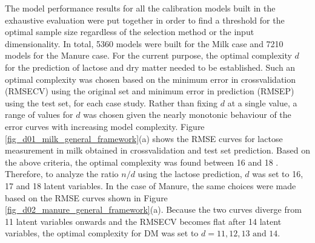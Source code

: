 \documentclass[journal=ancham,manuscript=article]{achemso}
\begin{document}
The model performance results for all the calibration models built in the exhaustive evaluation were put together in order to find a threshold for the optimal sample size regardless of the selection method or the input dimensionality. In total, 5360 models were built for the Milk case and 7210 models for the Manure case. For the current purpose, the optimal complexity $d$ for the prediction of lactose and dry matter needed to be established. Such an optimal complexity was chosen based on the minimum error in crossvalidation (RMSECV) using the original set and minimum error in prediction (RMSEP) using the test set, for each case study. Rather than fixing $d$ at a single value, a range of values for $d$ was chosen given the nearly monotonic behaviour of the error curves with increasing model complexity. 
Figure \ref{fig_d01_milk_general_framework}(a) shows the RMSE curves for lactose measurement in milk obtained in crossvalidation and test set prediction. Based on the above criteria, the optimal complexity was found between 16 and 18 \cite{Diaz-Olivares2020}. Therefore, to analyze the ratio $n/d$ using the lactose prediction, $d$ was set to 16, 17 and 18 latent variables. In the case of Manure, the same choices were made based on the RMSE curves shown in Figure \ref{fig_d02_manure_general_framework}(a). Because the two curves diverge from 11 latent variables onwards and the RMSECV becomes flat after 14 latent variables, the optimal complexity for DM was set to $d = 11,12,13 \text{ and } 14$\cite{Saeys2005}. 
\end{document}
